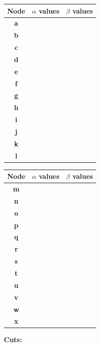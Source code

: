 \documentclass[11pt,a4paper]{report}
\begin{document}
\begin{answers}[8cm]
      \begin{multicols}{2}
      \begin{tabular}{ccc}
      Node & $\alpha$ values & $\beta$ values\\
      \hline
      \textbf{a} &  &  \\ %
      \textbf{b} &  &  \\
      \textbf{c} &  &  \\
      \textbf{d} &  &  \\
      \textbf{e} &  &  \\
      \textbf{f} &  &  \\
      \textbf{g} &  &  \\
      \textbf{h} &  &  \\
      \textbf{i} &  &  \\
      \textbf{j} &  &  \\
      \textbf{k} &  &  \\
      \textbf{l} &  &  \\
      \end{tabular}
      
      \begin{tabular}{ccc}
      Node & $\alpha$ values & $\beta$ values\\
      \hline
      \textbf{m} &  &  \\ %
      \textbf{n} &  &  \\
      \textbf{o} &  &  \\
      \textbf{p} &  &  \\
      \textbf{q} &  &  \\
      \textbf{r} &  &  \\
      \textbf{s} &  &  \\
      \textbf{t} &  &  \\
      \textbf{u} &  &  \\
      \textbf{v} &  &  \\
      \textbf{w} &  &  \\
      \textbf{x} &  &  \\
      \end{tabular}
      \end{multicols}
      
\textbf{Cuts:} %
\end{answers}
\end{document}

